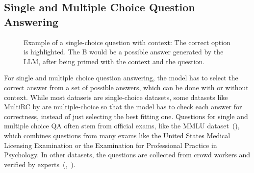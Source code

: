 \subsection{Single and Multiple Choice Question Answering}\label{sec:multiple-choice-qa}
\begin{figure}[tb]
    \centering
    \caption{Example of a single-choice question with context: The correct option is highlighted.
    The B would be a possible answer generated by the LLM, after being primed with the context and the question.
    }\label{fig:mc_example}
\end{figure}
For single and multiple choice question answering, the model has to select the correct answer from a set of possible answers, which can be done with or without context.
While most datasets are single-choice datasets, some datasets like MultiRC by \cite{khashabi:2018:Looking} are multiple-choice so that the model has to check each answer for correctness, instead of just selecting the best fitting one.
Questions for single and multiple choice QA often stem from official exams, like the MMLU dataset~(\cite{hendrycks:2020:Measuring}), which combines questions from many exams like the United States Medical Licensing Examination or the Examination for Professional Practice in Psychology.
In other datasets, the questions are collected from crowd workers and verified by experts~(\cite{clark:2018:Think},~\cite{mihaylov:2018:Can}).

